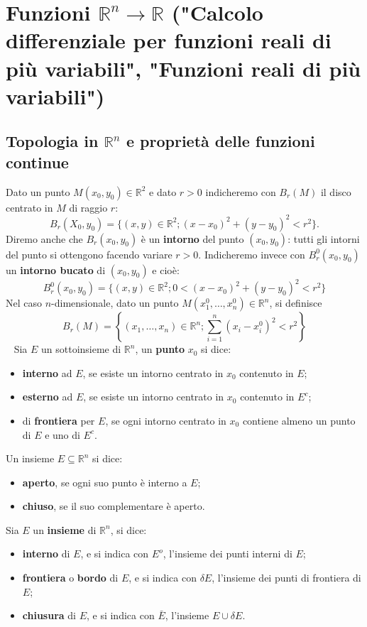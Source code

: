 \section{Funzioni $\mathbb{R}^n \rightarrow \mathbb{R}$ ("Calcolo differenziale per funzioni reali di più variabili", "Funzioni reali di più variabili")}
\subsection{Topologia in $\mathbb{R}^n$ e proprietà delle funzioni continue}
Dato un punto $M(x_0,y_0) \in \mathbb{R}^2$ e dato $r > 0$ indicheremo con $B_r(M)$ il disco centrato in $M$ di raggio $r$:
\[
    B_r(X_0,y_0) = \{ (x,y) \in \mathbb{R}^2; (x-x_0)^2+ (y-y_0)^2 < r^2\}.
\]
Diremo anche che $B_r(x_0,y_0)$ è un \textbf{intorno} del punto $(x_0,y_0)$: tutti gli intorni del punto si ottengono facendo variare $r>0$. Indicheremo invece con $B_r^0(x_0,y_0)$ un \textbf{intorno bucato} di $(x_0,y_0)$ e cioè:
\[
    B_r^0 (x_0,y_0) = \{ (x,y) \in \mathbb{R}^2; 0 < (x-x_0)^2 + (y-y_0)^2 < r^2\}
\]
Nel caso $n$-dimensionale, dato un punto $M(x_1^0, \dots, x_n^0) \in \mathbb{R}^n$, si definisce
\[
    B_r(M) = \left\{ (x_1, \dots,x_n) \in \mathbb{R}^n; \sum_{i=1}^{n} (x_i-x_i^0)^2 < r^2 \right\}
\]
\ \newline
Sia $E$ un sottoinsieme di $\mathbb{R}^n$, un \textbf{punto} $x_0$ si dice:
\begin{itemize}
    \item \textbf{interno} ad $E$, se esiste un intorno centrato in $x_0$ contenuto in $E$;
    \item \textbf{esterno} ad $E$, se esiste un intorno centrato in $x_0$ contenuto in $E^c$;
    \item di \textbf{frontiera} per $E$, se ogni intorno centrato in $x_0$ contiene almeno un punto di $E$ e uno di $E^c$.
\end{itemize}
Un insieme $E \subseteq \mathbb{R}^n$ si dice:
\begin{itemize}
    \item \textbf{aperto}, se ogni suo punto è interno a $E$;
    \item \textbf{chiuso}, se il suo complementare è aperto.
\end{itemize} 
Sia $E$ un \textbf{insieme} di $\mathbb{R}^n$, si dice:
\begin{itemize}
    \item \textbf{interno} di $E$, e si indica con $E^o$, l'insieme dei punti interni di $E$;
    \item \textbf{frontiera} o \textbf{bordo} di $E$, e si indica con $\delta E$, l'insieme dei punti di frontiera di $E$;
    \item \textbf{chiusura} di $E$, e si indica con $\bar{E}$, l'insieme $E \cup \delta E$.
\end{itemize}

